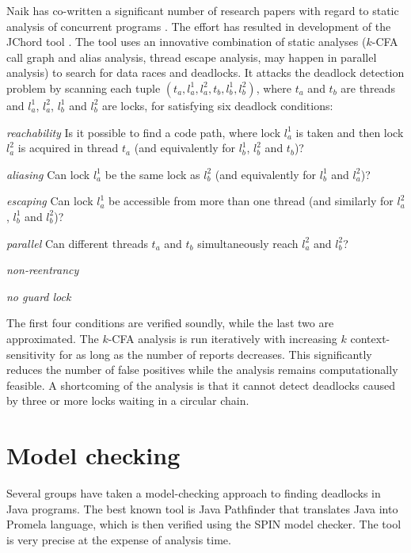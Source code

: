 Naik has co-written a significant number of research papers with regard to static analysis of concurrent programs \citep{Naik2006,Naik2008,Naik2009}. The effort has resulted in development of the JChord tool \citep{jchord}. The tool uses an innovative combination of static analyses ($k$-CFA call graph and alias analysis, thread escape analysis, may happen in parallel analysis) to search for data races and deadlocks. It attacks the deadlock detection problem by scanning each tuple $(t_a,l_a^1,l_a^2,t_b,l_b^1,l_b^2)$, where $t_a$ and $t_b$ are threads and $l_a^1$, $l_a^2$, $l_b^1$ and $l_b^2$ are locks, for satisfying six deadlock conditions:
\begin{itemize*}
\item \emph{reachability} \newline Is it possible to find a code path, where lock $l_a^1$ is taken and then lock $l_a^2$ is acquired in thread $t_a$ (and equivalently for $l_b^1$, $l_b^2$ and $t_b$)?
\item \emph{aliasing} \newline Can lock $l_a^1$ be the same lock as $l_b^2$ (and equivalently for $l_b^1$ and $l_a^2$)?
\item \emph{escaping} \newline Can lock $l_a^1$ be accessible from more than one thread (and similarly for $l_a^2$, $l_b^1$ and $l_b^2$)?
\item \emph{parallel} \newline Can different threads $t_a$ and $t_b$ simultaneously reach $l_a^2$ and $l_b^2$?
\item \emph{non-reentrancy}
\item \emph{no guard lock}
\end{itemize*}
The first four conditions are verified soundly, while the last two are approximated. The $k$-CFA analysis is run iteratively with increasing $k$ context-sensitivity for as long as the number of reports decreases. This significantly reduces the number of false positives while the analysis remains computationally feasible. A shortcoming of the analysis is that it cannot detect deadlocks caused by three or more locks waiting in a circular chain.

\section{Model checking}

Several groups have taken a model-checking approach to finding deadlocks in Java programs. The best known tool is Java Pathfinder \citep{Havelund1999,Brat2000} that translates Java into Promela language, which is then verified using the SPIN model checker. The tool is very precise at the expense of analysis time.

